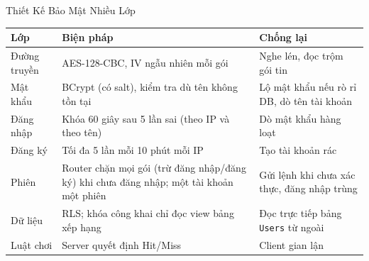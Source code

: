 \begin{frame}[label=bm]{Thiết Kế Bảo Mật Nhiều Lớp}
  \footnotesize
  \begin{tabularx}{\textwidth}{@{}l Y Y@{}}
    \toprule \textbf{Lớp} & \textbf{Biện pháp} & \textbf{Chống lại} \\ \midrule
    Đường truyền & AES-128-CBC, IV ngẫu nhiên mỗi gói & Nghe lén, đọc trộm gói tin \\
    Mật khẩu & BCrypt (có salt), kiểm tra dù tên không tồn tại & Lộ mật khẩu nếu rò rỉ DB, dò tên tài khoản \\
    Đăng nhập & Khóa 60 giây sau 5 lần sai (theo IP và theo tên) & Dò mật khẩu hàng loạt \\
    Đăng ký & Tối đa 5 lần mỗi 10 phút mỗi IP & Tạo tài khoản rác \\
    Phiên & Router chặn mọi gói (trừ đăng nhập/đăng ký) khi chưa đăng nhập; một tài khoản một phiên & Gửi lệnh khi chưa xác thực, đăng nhập trùng \\
    Dữ liệu & RLS; khóa công khai chỉ đọc view bảng xếp hạng & Đọc trực tiếp bảng \texttt{Users} từ ngoài \\
    Luật chơi & Server quyết định Hit/Miss & Client gian lận \\
    \bottomrule
  \end{tabularx}
\end{frame}

